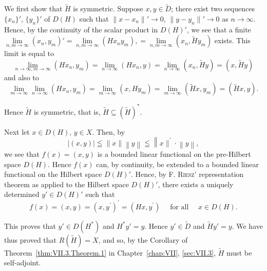 We first show that $\tilde{H}$ is symmetric. Suppose $x, y \in \tilde{D}$; there exist two sequences $\{x_n\}'$, $\{y_n\}'$ of $D(H)$ such that $\|x - x_n\|' \to 0$, $\|y - y_n\|' \to 0$ as $n \to \infty$. Hence, by the continuity of the scalar product in $D(H)'$, we see that a finite $\lim\limits_{n,m \to \infty} (x_n, y_m)' = \lim\limits_{n,m \to \infty} (Hx_ny_m), = \lim\limits_{n,m \to \infty} (x_n, \tilde{H}y_m)$ exists. This limit is equal to 
\[
\lim\limits _{n \rightarrow \infty , m \rightarrow \infty} (H x _{n}, y _{m}) = \lim\limits _{n \rightarrow \infty} (H x _{n}, y) = \lim\limits _{n \rightarrow \infty} (x _{n}, \tilde {H} y) = (x, \tilde {H} y)
\]
and also to 
\[
\lim\limits _{m \rightarrow \infty} \lim\limits _{n \rightarrow \infty} (H x _{n}, y _{m}) = \lim\limits _{m \rightarrow \infty} (x, H y _{m}) = \lim\limits _{m \rightarrow \infty} (\tilde {H} x, y _{m}) = (\tilde {H} x, y).
\]

Hence $\tilde{H}$ is symmetric, that is, $\tilde{H} \subseteq (\tilde{H})^*$. 

Next let $x \in D(H)$, $y \in X$. Then, by 
\[
\left| (x, y) \right| \leqq \left\| x \| \right. \left\| y \right\| \leqq \left\| x \| ^{\prime} \cdot \right. \left\| y \right\|,
\]
we see that $f(x) = (x, y)$ is a bounded linear functional on the pre-Hilbert space $D(H)$. Hence $f(x)$ can, by continuity, be extended to a bounded linear functional on the Hilbert space $D(H)'$. Hence, by F. \textsc{Riesz}' representation theorem as applied to the Hilbert space $D(H)'$, there exists a uniquely determined $y' \in D(H)'$ such that 
\[
f (x) = (x, y) = \left(x, y ^{\prime}\right) ^{\prime} = \left(H x, y ^{\prime}\right) \quad \text{ for all } \quad x \in D (H).
\]

This proves that $y' \in D(H^*)$ and $H^*y' = y$. Hence $y' \in \tilde{D}$ and $\tilde{H}y' = y$. We have thus proved that $R(\tilde{H}) = X$, and so, by the Corollary of Theorem~\ref{thm:VII.3.Theorem.1} in Chapter~\ref{chap:VII}, \ref{sec:VII.3}, $\tilde{H}$ must be self-adjoint. 


\label{sec:XI.8}

